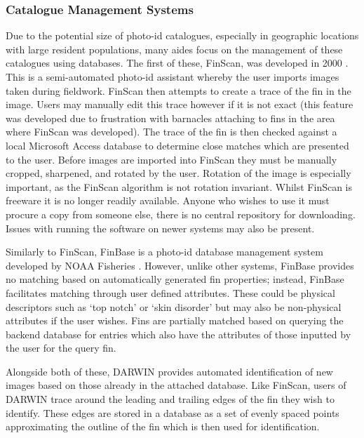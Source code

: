 \subsubsection{Catalogue Management Systems}\label{ch:Background,sec:conTech,sub:photoIDAides,subsub:databases}

Due to the potential size of photo-id catalogues, especially in geographic locations with large resident populations, many aides focus on the management of these catalogues using databases. The first of these, FinScan, was developed in 2000 \cite{hillman_finscan_2002}. This is a semi-automated photo-id assistant whereby the user imports images taken during fieldwork. FinScan then attempts to create a trace of the fin in the image. Users may manually edit this trace however if it is not exact (this feature was developed due to frustration with barnacles attaching to fins in the area where FinScan was developed). The trace of the fin is then checked against a local Microsoft Access database to determine close matches which are presented to the user. Before images are imported into FinScan they must be manually cropped, sharpened, and rotated by the user. Rotation of the image is especially important, as the FinScan algorithm is not rotation invariant. Whilst FinScan is freeware it is no longer readily available. Anyone who wishes to use it must procure a copy from someone else, there is no central repository for downloading. Issues with running the software on newer systems may also be present.

Similarly to FinScan, FinBase is a photo-id database management system developed by NOAA Fisheries \cite{fisheries_finbase_2018}. However, unlike other systems, FinBase provides no matching based on automatically generated fin properties; instead, FinBase facilitates matching through user defined attributes. These could be physical descriptors such as `top notch' or `skin disorder' but may also be non-physical attributes if the user wishes. Fins are partially matched based on querying the backend database for entries which also have the attributes of those inputted by the user for the query fin. 

Alongside both of these, DARWIN \cite{hale_unsupervised_2012} provides automated identification of new images based on those already in the attached database. Like FinScan, users of DARWIN trace around the leading and trailing edges of the fin they wish to identify. These edges are stored in a database as a set of evenly spaced points approximating the outline of the fin which is then used for identification.

